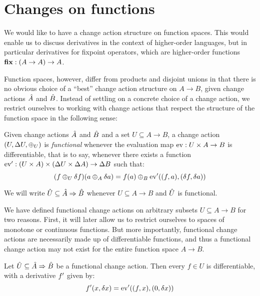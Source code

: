 \section{Changes on functions}


We would like to have a change action structure on function spaces. This would enable us
to discuss derivatives in the context of higher-order languages, but in particular derivatives for
fixpoint operators, which are higher-order functions $\mathbf{fix} : (A \rightarrow A) \rightarrow A$. 

Function spaces, however, differ from products and disjoint unions in that there is no obvious choice
of a ``best'' change action structure on $A \rightarrow B$, given change actions $\hat{A}$ and $\hat{B}$.
Instead of settling on a concrete choice of a change action, we restrict ourselves to working
with change actions that respect the structure of the function space in the following sense:

\begin{defn}
  \label{def:functionalChanges}
  Given change actions $\hat{A}$ and $\hat{B}$ and a set $U \subseteq A \rightarrow B$, a change action
  $(U, \Delta U, \oplus_U)$ is \emph{functional} whenever the evaluation map $\operatorname{ev} : U \times A \rightarrow B$
  is differentiable, that is to say, whenever there exists a function 
  $\operatorname{ev}' : (U \times A) \times (\Delta U \times \Delta A) \rightarrow \Delta B$ such that:
  \begin{displaymath}
    (f \oplus_U \delta f)(a \oplus_A \delta a) = 
    f(a) \oplus_B \operatorname{ev}'((f, a), (\delta f, \delta a))
  \end{displaymath}
  
  We will write $\hat{U} \subseteq \hat{A} \Rightarrow \hat{B}$ whenever 
  $U \subseteq A \rightarrow B$ and $\hat{U}$ is functional.
\end{defn}

We have defined functional change actions on arbitrary subsets $U \subseteq A \rightarrow B$ for two
reasons. First, it will later allow us to restrict ourselves to spaces of monotone or continuous
functions. But more importantly, functional change actions are necessarily made up of differentiable
functions, and thus a functional change action may not exist for the entire function space
$A \rightarrow B$.

\begin{prop}
  \label{prop:differentiableFunctionalChanges}
  Let $\hat{U} \subseteq \hat{A} \Rightarrow \hat{B}$ be a functional change action. Then every 
  $f \in U$ is differentiable, with a derivative $f'$ given by:
  \begin{displaymath}
    f'(x, \delta x) = \operatorname{ev}'((f, x), (0, \delta x))
  \end{displaymath}
\end{prop}

